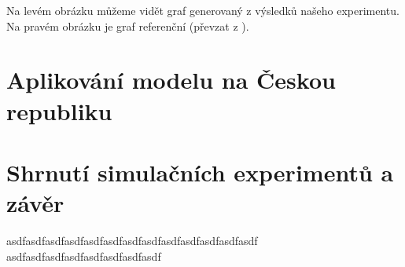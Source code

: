\documentclass[a4paper,11pt]{article}
\begin{document}
			Na levém obrázku můžeme vidět graf generovaný z výsledků našeho experimentu. Na pravém obrázku je graf referenční (převzat z \cite{source}). 
		
	\section{Aplikování modelu na Českou republiku}
	
	\section{Shrnutí simulačních experimentů a závěr}
		asdfasdfasdfasdfasdfasdfasdfasdfasdfasdfasdfasdfasdf
		asdfasdfasdfasdfasdfasdfasdfasdf

	\newpage
	
	\renewcommand{\refname}{Literatura}
	
\end{document}
